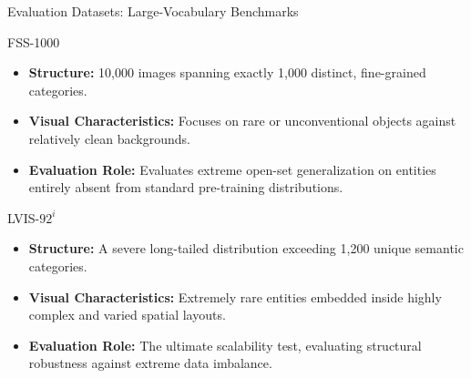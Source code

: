 \documentclass[aspectratio=169, 10pt]{beamer}
\begin{document}
\begin{frame}{Evaluation Datasets: Large-Vocabulary Benchmarks}
    \begin{block}{FSS-1000 \cite{li2020fss}}
        \begin{itemize}
            \item \textbf{Structure:} 10,000 images spanning exactly 1,000 distinct, fine-grained categories.
            \item \textbf{Visual Characteristics:} Focuses on rare or unconventional objects against relatively clean backgrounds.
            \item \textbf{Evaluation Role:} Evaluates extreme open-set generalization on entities entirely absent from standard pre-training distributions.
        \end{itemize}
    \end{block}

    \begin{block}{LVIS-$92^i$ \cite{gupta2019lvis}}
        \begin{itemize}
            \item \textbf{Structure:} A severe long-tailed distribution exceeding 1,200 unique semantic categories.
            \item \textbf{Visual Characteristics:} Extremely rare entities embedded inside highly complex and varied spatial layouts.
            \item \textbf{Evaluation Role:} The ultimate scalability test, evaluating structural robustness against extreme data imbalance.
        \end{itemize}
    \end{block}
\end{frame}
\end{document}
